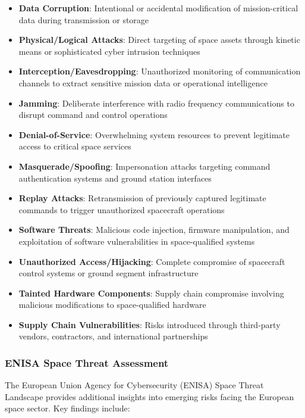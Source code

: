 \documentclass[binding=0.6cm]{sapthesis}
\begin{document}
\begin{itemize}
    \item \textbf{Data Corruption}: Intentional or accidental modification of mission-critical data during transmission or storage
    \item \textbf{Physical/Logical Attacks}: Direct targeting of space assets through kinetic means or sophisticated cyber intrusion techniques
    \item \textbf{Interception/Eavesdropping}: Unauthorized monitoring of communication channels to extract sensitive mission data or operational intelligence
    \item \textbf{Jamming}: Deliberate interference with radio frequency communications to disrupt command and control operations
    \item \textbf{Denial-of-Service}: Overwhelming system resources to prevent legitimate access to critical space services
    \item \textbf{Masquerade/Spoofing}: Impersonation attacks targeting command authentication systems and ground station interfaces
    \item \textbf{Replay Attacks}: Retransmission of previously captured legitimate commands to trigger unauthorized spacecraft operations
    \item \textbf{Software Threats}: Malicious code injection, firmware manipulation, and exploitation of software vulnerabilities in space-qualified systems
    \item \textbf{Unauthorized Access/Hijacking}: Complete compromise of spacecraft control systems or ground segment infrastructure
    \item \textbf{Tainted Hardware Components}: Supply chain compromise involving malicious modifications to space-qualified hardware
    \item \textbf{Supply Chain Vulnerabilities}: Risks introduced through third-party vendors, contractors, and international partnerships
\end{itemize}

\subsubsection{ENISA Space Threat Assessment}

The European Union Agency for Cybersecurity (ENISA) Space Threat Landscape provides additional insights into emerging risks facing the European space sector. Key findings include:
\end{document}
